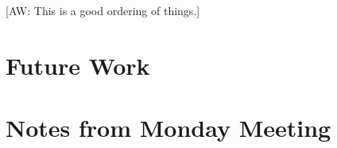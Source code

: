 \documentclass[a4paper]{article}
\newcommand{\aw}[1]{{\color{blue} [AW: #1]}}
\begin{document}
\aw{This is a good ordering of things.}

\section{Future Work}

\section{Notes from Monday Meeting}

\printbibliography
\end{document}
